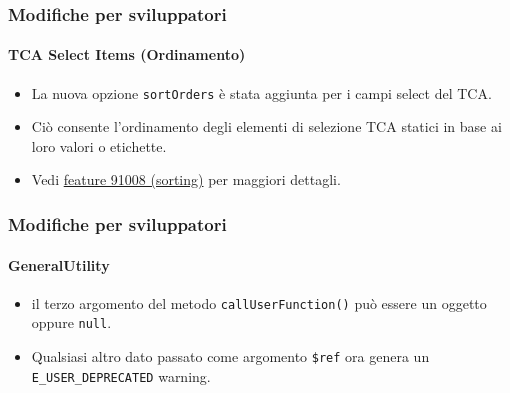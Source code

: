 
\begin{frame}[fragile]
	\frametitle{Modifiche per sviluppatori}
	\framesubtitle{TCA Select Items (Ordinamento)}

	\begin{itemize}
		\item La nuova opzione \texttt{sortOrders} è stata aggiunta per i campi select del TCA.
		\item Ciò consente l'ordinamento degli elementi di selezione TCA statici in base ai loro valori o etichette.
		\item Vedi
			\href{https://docs.typo3.org/c/typo3/cms-core/master/en-us/Changelog/10.4/Feature-91008-ItemSortingForTCASelectItems.html}{feature 91008 (sorting)}
			per maggiori dettagli.
	\end{itemize}

\end{frame}


\begin{frame}[fragile]
	\frametitle{Modifiche per sviluppatori}
	\framesubtitle{GeneralUtility}

	\begin{itemize}
		\item il terzo argomento del metodo \texttt{callUserFunction()}
			può essere un oggetto oppure \texttt{null}.
		\item Qualsiasi altro dato passato come argomento \texttt{\$ref} ora genera
			un \texttt{E\_USER\_DEPRECATED} warning.
	\end{itemize}

\end{frame}


